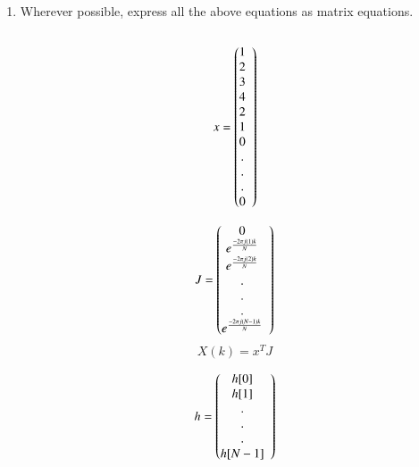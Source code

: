 \documentclass[journal,12pt,twocolumn]{IEEEtran}
\renewcommand\thesection{\arabic{section}}
\begin{document}
\begin{enumerate}[label=\thesection.\arabic*]
	\item Wherever possible, express all the above equations as matrix equations.\\
	\solution \\
	\[
	\begin{array}{lc}
		x = 
		\left(\begin{array}{@{}ccc@{}}
			1 \\
			2 \\
			3 \\
			4 \\
			2 \\
			1 \\
			0 \\
			. \\
			. \\
			. \\
			0 \\
		\end{array}\right) \\[15pt]
	\end{array}
	\]
	
	\[
	\begin{array}{lc}
		J = 
		\left(\begin{array}{@{}ccc@{}}
			0 \\
			e^{\frac{-2\pi j(1)k}{N}} \\
			e^{\frac{-2\pi j(2)k}{N}} \\
			. \\
			. \\
			. \\
			e^{\frac{-2\pi j(N-1)k}{N}} \\
		\end{array}\right) \\[15pt]
	\end{array}
	\]
	\begin{equation}
		X(k) = x^{T} J
	\end{equation}
	
	\[
	\begin{array}{lc}
		h = 
		\left(\begin{array}{@{}ccc@{}}
			h[0] \\
			h[1] \\
			. \\
			. \\
			. \\
			h[N-1] \\
		\end{array}\right) \\[15pt]
	\end{array}
	\]
	

\end{enumerate}
\end{document}
